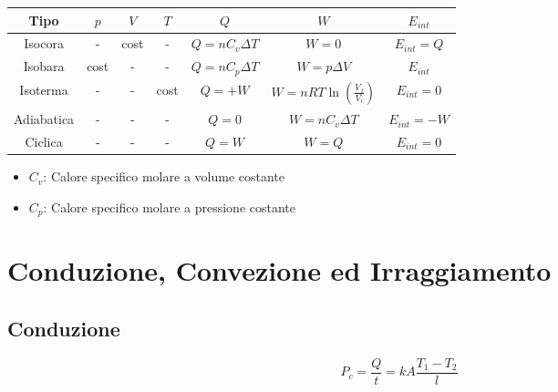             \begin{tabular}{ |c|c|c|c|c|c|c| } 
                \hline
                    \textbf{Tipo} & $p$ & $V$ & $T$ & $Q$ & $W$ & $E_{int}$ \\
                \hline
                    Isocora 
                        & - 
                        & cost 
                        & - 
                        & $Q = nC_v\Delta T$ 
                        & $W = 0$
                        & $E_{int} = Q$ \\
                \hline
                    Isobara
                        & cost
                        & - 
                        & - 
                        & $Q = nC_p\Delta T$
                        & $W = p\Delta V$
                        & $E_{int}$ \\
                \hline
                    Isoterma
                        & -
                        & - 
                        & cost
                        & $Q = + W$
                        & $W = nRT\ln(\frac{V_f}{V_i})$
                        & $E_{int} = 0$ \\
                \hline
                    Adiabatica
                        & -
                        & - 
                        & -
                        & $Q = 0$
                        & $W = nC_v\Delta T$
                        & $E_{int} = -W$ \\
                \hline
                    Ciclica
                        & -
                        & - 
                        & -
                        & $Q = W$
                        & $W = Q$
                        & $E_{int} = 0$ \\
                \hline
            \end{tabular}

        \begin{itemize}
            \item $C_v$: Calore specifico molare a volume costante
            \item $C_p$: Calore specifico molare a pressione costante
        \end{itemize}

        \section*{Conduzione, Convezione ed Irraggiamento} 

            \subsection*{Conduzione}
                \begin{equation*}
                    P_c = \frac{Q}{t} = kA\frac{T_1 - T_2}{l}
                \end{equation*}

